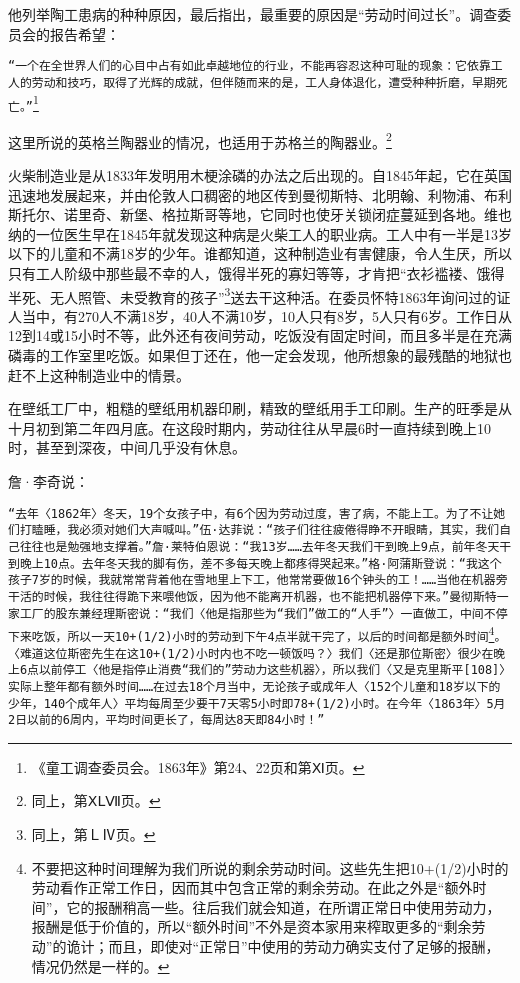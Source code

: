 \documentclass{ctexbook}
\begin{document}
    他列举陶工患病的种种原因，最后指出，最重要的原因是“劳动时间过长”。调查委员会的报告希望：

    \texttt{“一个在全世界人们的心目中占有如此卓越地位的行业，不能再容忍这种可耻的现象：它依靠工人的劳动和技巧，取得了光辉的成就，但伴随而来的是，工人身体退化，遭受种种折磨，早期死亡。”}\footnote{《童工调查委员会。1863年》第24、22页和第Ⅺ页。}

    这里所说的英格兰陶器业的情况，也适用于苏格兰的陶器业。\footnote{同上，第ⅩⅬⅦ页。}

    火柴制造业是从1833年发明用木梗涂磷的办法之后出现的。自1845年起，它在英国迅速地发展起来，并由伦敦人口稠密的地区传到曼彻斯特、北明翰、利物浦、布利斯托尔、诺里奇、新堡、格拉斯哥等地，它同时也使牙关锁闭症蔓延到各地。维也纳的一位医生早在1845年就发现这种病是火柴工人的职业病。工人中有一半是13岁以下的儿童和不满18岁的少年。谁都知道，这种制造业有害健康，令人生厌，所以只有工人阶级中那些最不幸的人，饿得半死的寡妇等等，才肯把“衣衫褴褛、饿得半死、无人照管、未受教育的孩子”\footnote{同上，第ＬⅣ页。}送去干这种活。在委员怀特1863年询问过的证人当中，有270人不满18岁，40人不满10岁，10人只有8岁，5人只有6岁。工作日从12到14或15小时不等，此外还有夜间劳动，吃饭没有固定时间，而且多半是在充满磷毒的工作室里吃饭。如果但丁还在，他一定会发现，他所想象的最残酷的地狱也赶不上这种制造业中的情景。

    在壁纸工厂中，粗糙的壁纸用机器印刷，精致的壁纸用手工印刷。生产的旺季是从十月初到第二年四月底。在这段时期内，劳动往往从早晨6时一直持续到晚上10时，甚至到深夜，中间几乎没有休息。

    詹·李奇说：

    \texttt{“去年〈1862年〉冬天，19个女孩子中，有6个因为劳动过度，害了病，不能上工。为了不让她们打瞌睡，我必须对她们大声喊叫。”伍·达菲说：“孩子们往往疲倦得睁不开眼睛，其实，我们自己往往也是勉强地支撑着。”詹·莱特伯恩说：“我13岁……去年冬天我们干到晚上9点，前年冬天干到晚上10点。去年冬天我的脚有伤，差不多每天晚上都疼得哭起来。”格·阿蒲斯登说：“我这个孩子7岁的时候，我就常常背着他在雪地里上下工，他常常要做16个钟头的工！……当他在机器旁干活的时候，我往往得跪下来喂他饭，因为他不能离开机器，也不能把机器停下来。”曼彻斯特一家工厂的股东兼经理斯密说：“我们〈他是指那些为“我们”做工的“人手”〉一直做工，中间不停下来吃饭，所以一天10+(1/2)小时的劳动到下午4点半就干完了，以后的时间都是额外时间}\footnote{不要把这种时间理解为我们所说的剩余劳动时间。这些先生把10+(1/2)小时的劳动看作正常工作日，因而其中包含正常的剩余劳动。在此之外是“额外时间”，它的报酬稍高一些。往后我们就会知道，在所谓正常日中使用劳动力，报酬是低于价值的，所以“额外时间”不外是资本家用来榨取更多的“剩余劳动”的诡计；而且，即使对“正常日”中使用的劳动力确实支付了足够的报酬，情况仍然是一样的。}\texttt{。〈难道这位斯密先生在这10+(1/2)小时内也不吃一顿饭吗？〉我们〈还是那位斯密〉很少在晚上6点以前停工〈他是指停止消费“我们的”劳动力这些机器〉，所以我们〈又是克里斯平[108]〉实际上整年都有额外时间……在过去18个月当中，无论孩子或成年人〈152个儿童和18岁以下的少年，140个成年人〉平均每周至少要干7天零5小时即78+(1/2)小时。在今年〈1863年〉5月2日以前的6周内，平均时间更长了，每周达8天即84小时！”}
\end{document}
